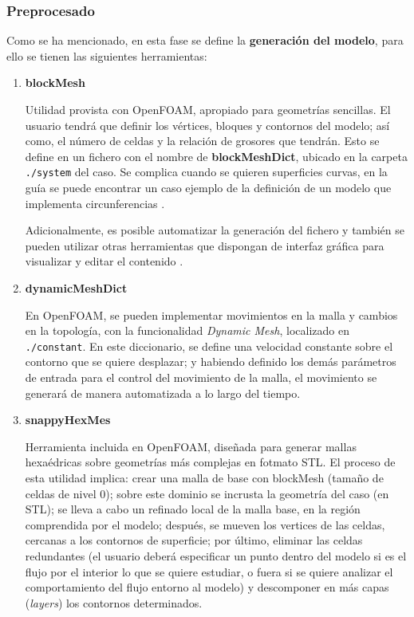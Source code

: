 \subsubsection{Preprocesado}\label{header-n68}

Como se ha mencionado, en esta fase se define la \textbf{generación del modelo}, para ello se tienen las siguientes herramientas: 

\begin{enumerate}
\def\labelenumi{\arabic{enumi}.}
\item
  \textbf{blockMesh} \cite{guideblockMesh}

  Utilidad provista con OpenFOAM, apropiado para geometrías sencillas. El
usuario tendrá que definir los vértices, bloques y contornos del modelo;
así como, el número de celdas y la relación de grosores que tendrán.
Esto se define en un fichero con el nombre de \textbf{blockMeshDict},
ubicado en la carpeta \lstinline[style=bash]{./system} del caso. Se
complica cuando se quieren superficies curvas, en la guía se puede encontrar un caso ejemplo de la definición de un modelo que implementa circunferencias 
\cite{hole}.

Adicionalmente, es posible automatizar la generación del fichero y
también se pueden utilizar otras herramientas que dispongan de interfaz
gráfica para visualizar y editar el contenido \cite{OFwiki-blockMesh}.

\item
  \textbf{dynamicMeshDict} \cite{Nozaki}

En OpenFOAM, se pueden implementar movimientos en la malla y cambios en
la topología, con la funcionalidad \emph{Dynamic Mesh}, localizado en
\lstinline[style=bash]{./constant}. En este diccionario, se define una
velocidad constante sobre el contorno que se quiere desplazar; y
habiendo definido los demás parámetros de entrada para el control del
movimiento de la malla, el movimiento se generará de manera automatizada
a lo largo del tiempo.

\item
  \textbf{snappyHexMes} \cite{snappyHexMesh}

Herramienta incluida en OpenFOAM, diseñada para generar mallas
hexaédricas sobre geometrías más complejas en fotmato STL. El proceso de
esta utilidad implica: crear una malla de base con blockMesh (tamaño de
celdas de nivel 0); sobre este dominio se incrusta la geometría del caso
(en STL); se lleva a cabo un refinado local de la malla base, en la
región comprendida por el modelo; después, se mueven los vertices de las
celdas, cercanas a los contornos de superficie; por último, eliminar las
celdas redundantes (el usuario deberá especificar un punto dentro del
modelo si es el flujo por el interior lo que se quiere estudiar, o fuera
si se quiere analizar el comportamiento del flujo entorno al modelo) y
descomponer en más capas (\emph{layers}) los contornos determinados.


\end{enumerate}
